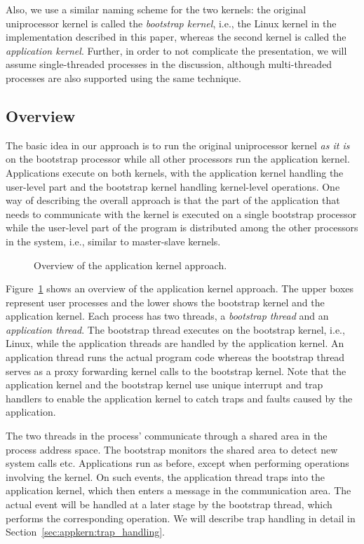 Also, we use a similar naming scheme for the two kernels: the original
uniprocessor kernel is called the \emph{bootstrap kernel}, i.e., the Linux
kernel in the implementation described in this paper, whereas the second
kernel is called the \emph{application kernel}.  Further, in order to not
complicate the presentation, we will assume single-threaded processes in the
discussion, although multi-threaded processes are also supported using the
same technique.

\subsection{Overview}
The basic idea in our approach is to run the original uniprocessor kernel
\emph{as it is} on the bootstrap processor while all other processors run the
application kernel. Applications execute on both kernels, with the application
kernel handling the user-level part and the bootstrap kernel handling
kernel-level operations.  One way of describing the overall approach is that
the part of the application that needs to communicate with the kernel is
executed on a single bootstrap processor while the user-level part of the
program is distributed among the other processors in the system, i.e., similar
to master-slave kernels.

\begin{figure}
  \begin{center}
  \end{center}
  \caption{Overview of the application kernel approach.}
  \label{fig:approach}
\end{figure}

Figure~\ref{fig:approach} shows an overview of the application kernel
approach. The upper boxes represent user processes and the lower shows the
bootstrap kernel and the application kernel. Each process has two threads, a
\emph{bootstrap thread} and an \emph{application thread}. The bootstrap thread
executes on the bootstrap kernel, i.e., Linux, while the application threads
are handled by the application kernel. An application thread runs the actual
program code whereas the bootstrap thread serves as a proxy\label{fix:relay}
forwarding kernel calls to the bootstrap kernel. Note that the application
kernel and the bootstrap kernel use unique interrupt and trap handlers to
enable the application kernel to catch traps and faults caused by the
application.

The two threads in the process' communicate through a shared area in the
process address space. The bootstrap monitors the shared area to detect new
system calls etc. Applications run as before, except when performing
operations involving the kernel. On such events, the application thread traps
into the application kernel, which then enters a message in the communication
area. The actual event will be handled at a later stage by the bootstrap
thread, which performs the corresponding operation. We will describe trap
handling in detail in Section~\ref{sec:appkern:trap_handling}.

